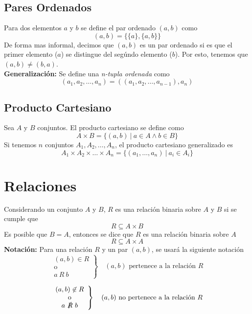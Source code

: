 \documentclass[../main.tex]{subfiles}
\begin{document}
\subsection{Pares Ordenados}
Para dos elementos $a$ y $b$ se define el par ordenado $(a,b)$ como
\[ (a,b) = \{ \{ a \}, \{ a,b \} \} \]
De forma mas informal, decimos que $(a,b)$ es un par ordenado si es que el primer elemento ($a$) se distingue del segúndo elemento ($b$). Por esto, tenemos que $(a,b) \not= (b,a)$.\\
\textbf{Generalización:} Se define una \textit{n-tupla ordenada} como
\[ (a_1, a_2, \ldots, a_n) = ((a_1, a_2, \ldots, a_{n-1}), a_n) \]

\subsection{Producto Cartesiano}
Sea $A$ y $B$ conjuntos. El producto cartesiano se define como
\[ A \times B = \{ (a,b) \  | \  a \in A \wedge b \in B \} \]
Si tenemos $n$ conjuntos $A_1, A_2, \ldots, A_n$, el producto cartesiano generalizado es
\[ A_1 \times A_2 \times \ldots \times A_n = \{ (a_1, \ldots, a_n) \  | \ a_i \in A_i \} \]

\section{Relaciones}
Considerando un conjunto $A$ y $B$, $R$ es una relación binaria sobre $A$ y $B$ si se cumple que
\[ R \subseteq A \times B \]
Es posible que $B = A$, entonces se dice que $R$ es una relación binaria sobre $A$
\[ R \subseteq A \times A \]
\textbf{Notación:} Para una relación $R$ y un par $(a,b)$, se usará la siguiente notación\\
\[
    \left.
        \begin{array}{c}
            (a,b) \in R \\
            \text{o} \\
            a \ R \ b
        \end{array}
    \right	
        \} \quad (a, b) \text{ pertenece a la relación } R
\]


\[
    \left.
        \begin{array}{c}
            (a,b) \not\in R \\
            \text{o}\\
            a \ \slashed{R} \ b
        \end{array}
    \right
        \} \quad (a,b) \text{ no pertenece a la relación } R
\]
\end{document}
